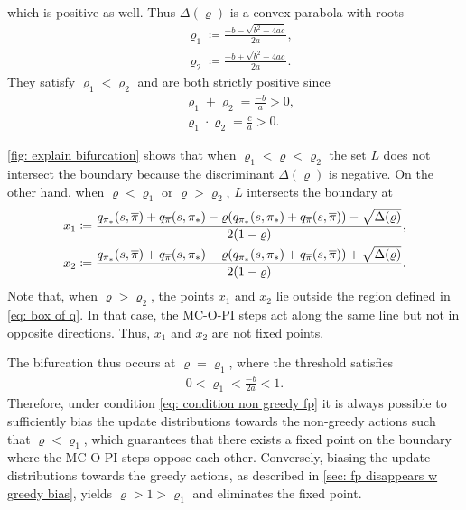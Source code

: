 which is positive as well.
Thus $\Delta(\varrho)$ is a convex parabola with roots
\begin{align}
\label{eq: threshold for position}
    &\varrho_1 \coloneqq \frac{-b - \sqrt{b^2 - 4ac} }{2a} ,
    \\
\label{eq: threshold for position 2}
    &\varrho_2 \coloneqq \frac{-b + \sqrt{b^2 - 4ac} }{2a} .
\end{align}
They satisfy $\varrho_1 < \varrho_2$ and are both strictly positive since
\begin{align*}
    &\varrho_1 + \varrho_2 = \frac{-b}{a} > 0 ,
    \\
    &\varrho_1 \cdot \varrho_2 = \frac{c}{a} > 0 .
\end{align*}

\vspace{-0.2cm}

\autoref{fig: explain bifurcation} shows that when $\varrho_1 < \varrho < \varrho_2$ the set $L$ does not intersect the boundary because the discriminant $\Delta(\varrho)$ is negative.
On the other hand, when $\varrho < \varrho_1$ or $\varrho > \varrho_2$, $L$ intersects the boundary at 
\begin{align}
\label{eq: position fixed point}
    x_1 &\coloneqq
    \dfrac{ q_{{\pi}_*}(s, \overline{\pi}) + q_{\overline{\pi}}(s, {\pi}_*) - \varrho (q_{{\pi}_*}(s, {\pi}_*) + q_{\overline{\pi}}(s, \overline{\pi})) - \sqrt{\Delta(\varrho)}}{2(1-\varrho)} ,
    \\
    x_2 &\coloneqq
    \dfrac{ q_{{\pi}_*}(s, \overline{\pi}) + q_{\overline{\pi}}(s, {\pi}_*) - \varrho (q_{{\pi}_*}(s, {\pi}_*) + q_{\overline{\pi}}(s, \overline{\pi})) + \sqrt{\Delta(\varrho)}}{2(1-\varrho)} .
\end{align}
Note that, when $\varrho>\varrho_2$, the points $x_1$ and $x_2$ lie outside the region defined in \eqref{eq: box of q}. In that case, the MC-O-PI steps act along the same line but not in opposite directions. Thus, $x_1$ and $x_2$ are not fixed points.


The bifurcation thus occurs at $\varrho = \varrho_1$, where the threshold satisfies
\begin{align}
    0 < \varrho_1 < \frac{-b}{2a} < 1 .
\end{align}
Therefore, under 
condition \eqref{eq: condition non greedy fp}
it is always possible to sufficiently bias the update distributions towards the non-greedy actions such that $\varrho < \varrho_1$, which guarantees that there exists a fixed point on the boundary 
where the MC-O-PI steps oppose each other.
Conversely, biasing the update distributions towards the greedy actions, as described in \autoref{sec: fp disappears w greedy bias}, yields $\varrho > 1 > \varrho_1$ and eliminates the fixed point.

